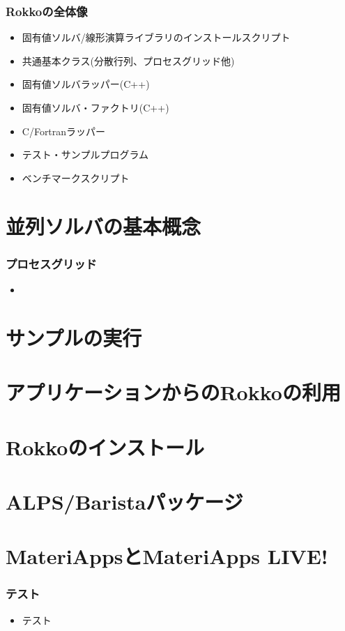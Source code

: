 \begin{frame}
  \frametitle{Rokkoの全体像}
  \begin{itemize}
  \item 固有値ソルバ/線形演算ライブラリのインストールスクリプト
  \item 共通基本クラス(分散行列、プロセスグリッド他)
  \item 固有値ソルバラッパー(C++)
  \item 固有値ソルバ・ファクトリ(C++)
  \item C/Fortranラッパー
  \item テスト・サンプルプログラム
  \item ベンチマークスクリプト
  \end{itemize}
\end{frame}

\section{並列ソルバの基本概念}

\begin{frame}
  \frametitle{プロセスグリッド}
  \begin{itemize}
  \item 
  \end{itemize}
\end{frame}

\section{サンプルの実行}
\section{アプリケーションからのRokkoの利用}
\section{Rokkoのインストール}
\section{ALPS/Baristaパッケージ}
\section{MateriAppsとMateriApps LIVE!}

\begin{frame}
  \frametitle{テスト}
  \begin{itemize}
  \item テスト
  \end{itemize}
\end{frame}


